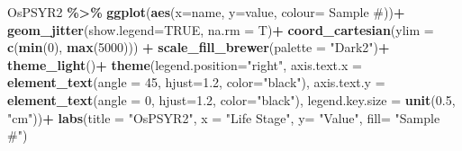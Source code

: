 \documentclass[
]{article}
\newenvironment{Shaded}{\begin{snugshade}}{\end{snugshade}}
\newcommand{\AttributeTok}[1]{\textcolor[rgb]{0.13,0.29,0.53}{#1}}
\newcommand{\ConstantTok}[1]{\textcolor[rgb]{0.56,0.35,0.01}{#1}}
\newcommand{\DecValTok}[1]{\textcolor[rgb]{0.00,0.00,0.81}{#1}}
\newcommand{\FloatTok}[1]{\textcolor[rgb]{0.00,0.00,0.81}{#1}}
\newcommand{\FunctionTok}[1]{\textcolor[rgb]{0.13,0.29,0.53}{\textbf{#1}}}
\newcommand{\NormalTok}[1]{#1}
\newcommand{\SpecialCharTok}[1]{\textcolor[rgb]{0.81,0.36,0.00}{\textbf{#1}}}
\newcommand{\StringTok}[1]{\textcolor[rgb]{0.31,0.60,0.02}{#1}}
\begin{document}
\begin{Shaded}
\begin{Highlighting}[]
\NormalTok{ OsPSYR2 }\SpecialCharTok{\%\textgreater{}\%} 
  \FunctionTok{ggplot}\NormalTok{(}\FunctionTok{aes}\NormalTok{(}\AttributeTok{x=}\NormalTok{name, }\AttributeTok{y=}\NormalTok{value, }\AttributeTok{colour=} \StringTok{\textasciigrave{}}\AttributeTok{Sample \#}\StringTok{\textasciigrave{}}\NormalTok{))}\SpecialCharTok{+}
  \FunctionTok{geom\_jitter}\NormalTok{(}\AttributeTok{show.legend=}\ConstantTok{TRUE}\NormalTok{, }\AttributeTok{na.rm =}\NormalTok{ T)}\SpecialCharTok{+}
  \FunctionTok{coord\_cartesian}\NormalTok{(}\AttributeTok{ylim =} \FunctionTok{c}\NormalTok{(}\FunctionTok{min}\NormalTok{(}\DecValTok{0}\NormalTok{), }\FunctionTok{max}\NormalTok{(}\DecValTok{5000}\NormalTok{))) }\SpecialCharTok{+}
  \FunctionTok{scale\_fill\_brewer}\NormalTok{(}\AttributeTok{palette =} \StringTok{"Dark2"}\NormalTok{)}\SpecialCharTok{+}
  \FunctionTok{theme\_light}\NormalTok{()}\SpecialCharTok{+}
  \FunctionTok{theme}\NormalTok{(}\AttributeTok{legend.position=}\StringTok{"right"}\NormalTok{, }
        \AttributeTok{axis.text.x =} \FunctionTok{element\_text}\NormalTok{(}\AttributeTok{angle =} \DecValTok{45}\NormalTok{, }\AttributeTok{hjust=}\FloatTok{1.2}\NormalTok{, }\AttributeTok{color=}\StringTok{"black"}\NormalTok{), }
        \AttributeTok{axis.text.y =} \FunctionTok{element\_text}\NormalTok{(}\AttributeTok{angle =} \DecValTok{0}\NormalTok{, }\AttributeTok{hjust=}\FloatTok{1.2}\NormalTok{, }\AttributeTok{color=}\StringTok{"black"}\NormalTok{), }
        \AttributeTok{legend.key.size =} \FunctionTok{unit}\NormalTok{(}\FloatTok{0.5}\NormalTok{, }\StringTok{"cm"}\NormalTok{))}\SpecialCharTok{+}
  \FunctionTok{labs}\NormalTok{(}\AttributeTok{title =} \StringTok{"OsPSYR2"}\NormalTok{,}
       \AttributeTok{x =} \StringTok{"Life Stage"}\NormalTok{,}
       \AttributeTok{y=} \StringTok{"Value"}\NormalTok{,}
       \AttributeTok{fill=} \StringTok{"Sample \#"}\NormalTok{)}
\end{Highlighting}
\end{Shaded}
\end{document}
